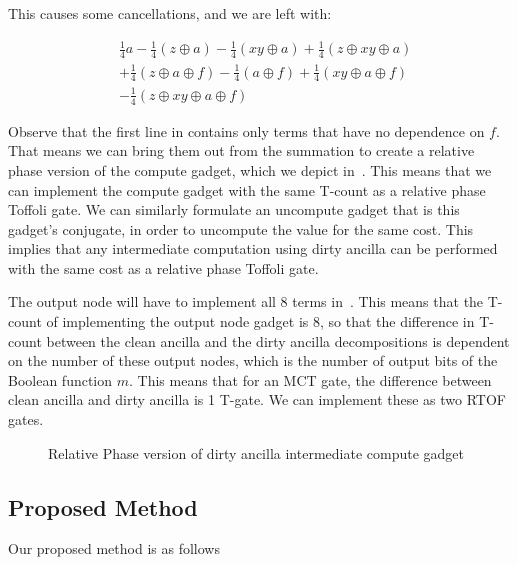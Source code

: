 This causes some cancellations, and we are left with:

\begin{equation}
  \label{eq-toff-simp}
  \begin{aligned}
    &\frac{1}{4}a - \frac{1}{4}(z \oplus a) - \frac{1}{4}(xy \oplus a) + \frac{1}{4}(z \oplus xy \oplus a)  \\
    &+ \frac{1}{4}(z \oplus a \oplus f) - \frac{1}{4}(a \oplus f) + \frac{1}{4}(xy \oplus a \oplus f) \\
    &- \frac{1}{4}(z \oplus xy \oplus a \oplus f)
  \end{aligned}
\end{equation}

Observe that the first line in contains only terms that have no dependence on $f$.
That means we can bring them out from the summation to create a relative phase version of the compute
gadget, which we depict in~. This means that we can implement the compute
gadget with the same T-count as a relative phase Toffoli gate. We can similarly formulate an uncompute
gadget that is this gadget's conjugate, in order to uncompute the value for the same cost. This implies
that any intermediate computation using dirty ancilla can be performed with the same cost as a relative
phase Toffoli gate.

The output node will have to implement all 8 terms in~. This means that the T-count of
implementing the output node gadget is 8, so that the difference in T-count between the clean ancilla and
the dirty ancilla decompositions is dependent on the number of these output nodes, which is the number of
output bits of the Boolean function $m$. This means that for an MCT gate, the difference between clean
ancilla and dirty ancilla is 1 T-gate. We can implement these as two RTOF gates.

\begin{figure}
  \scalebox{0.6} {
    
  }
  \caption{Relative Phase version of dirty ancilla intermediate compute gadget}
  \label{fig-dirty-gadget-rp}
\end{figure}

\subsection{Proposed Method}

Our proposed method is as follows

